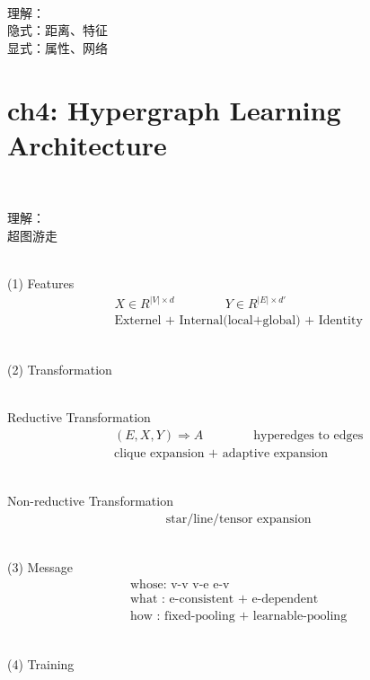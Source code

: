 \documentclass{article}
\begin{document}
~ \\[3pt]
\begin{CJK}{UTF8}{gbsn}
    理解： \\[3pt]
        隐式：距离、特征  \\[3pt]
        显式：属性、网络  \\[3pt]
\end{CJK}


\newpage
\section*{ch4: Hypergraph Learning Architecture}


~ \\[3pt]
\begin{CJK}{UTF8}{gbsn}
    理解： \\[3pt]
        超图游走  \\[3pt]
\end{CJK}


~ \\[3pt]
(1) Features
\begin{align*}
    & X \in R^{ |V| \times d } \qquad \qquad Y \in R^{ |E| \times d'} \\[3pt]
    & \text{Externel + Internal(local+global) + Identity}
\end{align*}


~ \\[3pt]
(2) Transformation

~ \\[3pt]
Reductive Transformation
\begin{align*}
    & ( E, X, Y ) \Rightarrow A 
    \qquad \qquad 
    \text{hyperedges to edges} \\[3pt]
    & \text{clique expansion + adaptive expansion}
\end{align*}

~ \\[3pt]
Non-reductive Transformation
\begin{align*}
    & \text{star/line/tensor expansion}
\end{align*}


~ \\[3pt]
(3) Message
\begin{align*}
    & \text{whose: v-v \ v-e \ e-v} \\[3pt]
    & \text{what : e-consistent + e-dependent} \\[3pt]
    & \text{how  : fixed-pooling + learnable-pooling} 
\end{align*}


~ \\[3pt]
(4) Training
\end{document}
